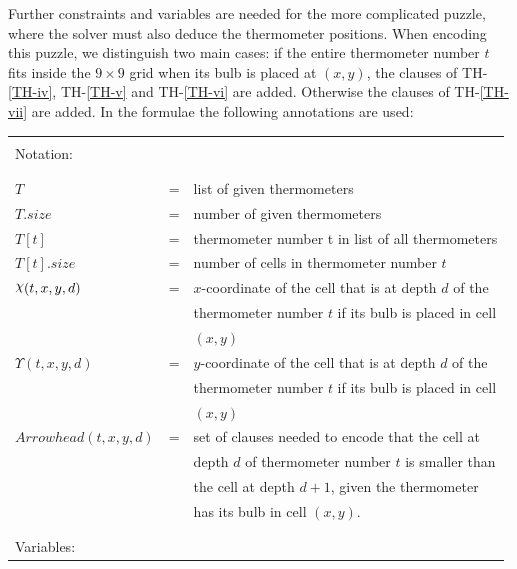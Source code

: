 Further constraints and variables are needed for the more complicated puzzle, where the solver must also deduce the thermometer positions.  
When encoding this puzzle, we distinguish two main cases: if the entire thermometer number $t$ fits inside the $9\times9$ grid when its bulb is placed at $(x,y)$, the clauses of TH-\ref{TH-iv}, TH-\ref{TH-v} and TH-\ref{TH-vi} are added. Otherwise the clauses of TH-\ref{TH-vii} are added.
In the formulae the following annotations are used:

\begin{table}[!ht]
    \centering
    \begin{tabular}{l c l}
    \hline
    \\
    Notation: &&\\
    \\
    \hline
    \\
    $T$                     &= &list of given thermometers\\
    $T.size$                &= &number of given thermometers\\
    $T[t]$                  &= &thermometer number t in list of all thermometers\\
    $T[t].size$             &= &number of cells in thermometer number $t$\\
    $\rchi(t,x,y,d)$           &= &$x$-coordinate of the cell that is at depth $d$ of the\\
                            &  &thermometer number $t$ if its bulb is placed in cell\\
                            &  &$(x,y)$\\
    $\Upsilon(t,x,y,d)$           &= &$y$-coordinate of the cell that is at depth $d$ of the\\
                            &  &thermometer number $t$ if its bulb is placed in cell\\
                            &  &$(x,y)$\\
    $Arrowhead(t,x,y,d)$    &= &set of clauses needed to encode that the cell at\\
                            &  &depth $d$ of thermometer number $t$ is smaller than\\
                            &  &the cell at depth $d+1$, given the thermometer\\
                            &  &has its bulb in cell $(x,y)$.\\
    \\
    \hline
    \\
    Variables:&&\\

\end{tabular}
\end{table}
